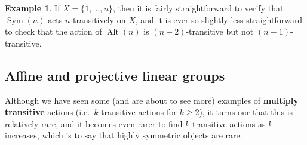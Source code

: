 \documentclass[11pt]{amsart}
\theoremstyle{plain}
\theoremstyle{definition}
\newtheorem{example}{Example}
\theoremstyle{remark}
\DeclareMathOperator{\Sym}{Sym}
\DeclareMathOperator{\Alt}{Alt}
\begin{document}
\begin{example}
If $X = \{1,\ldots,n\}$, then it is fairly straightforward to verify that $\Sym(n)$ acts $n$-transitively on $X$, and it is ever so slightly less-straightforward to check that the action of $\Alt(n)$ is $(n-2)$-transitive but not $(n-1)$-transitive. 
\end{example}

\subsection{Affine and projective linear groups}

Although we have seen some (and are about to see more) examples  of \textbf{multiply transitive} actions (i.e.~$k$-transitive actions for $k\ge 2$), it turns our that this is relatively rare, and it becomes even rarer to find $k$-transitive actions as $k$ increases, which is to say that highly symmetric objects are rare. 

\end{document}
